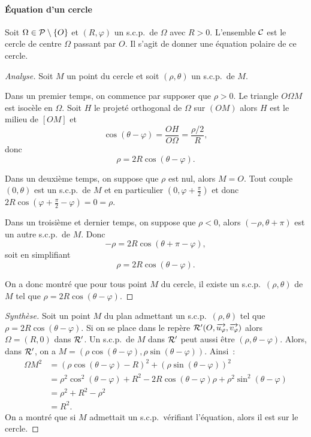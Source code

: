 \paragraph{Équation d'un cercle}
\label{par:eqcercle}
Soit \(\Omega \in \P \setminus\{O\}\) et \((R,\varphi)\) un s.c.p.\ de \(\Omega\) avec \(R>0\). L'ensemble \(\courbe\) est le cercle de centre \(\Omega\) passant par \(O\). Il s'agit de donner une équation polaire de ce cercle.
\begin{proof}[Analyse]
Soit \(M\) un point du cercle et soit \((\rho, \theta)\) un s.c.p.\ de \(M\). 

Dans un premier temps, on commence par supposer que \(\rho >0\). Le triangle \(O\Omega M\) est isocèle en \(\Omega\). Soit \(H\) le projeté orthogonal de \(\Omega\) sur \((OM)\) alors \(H\) est le milieu de \([OM]\) et
\begin{equation}
 \cos(\theta - \varphi)=\frac{OH}{O\Omega}=\frac{\rho/2}{R}, 
\end{equation}
donc
\begin{equation}  
  \rho=2R \cos(\theta-\varphi). 
\end{equation}

Dans un deuxième temps, on suppose que \(\rho\) est nul, alors \(M=O\). Tout couple \((0,\theta)\) est un s.c.p.\ de \(M\) et en particulier \((0,\varphi+\frac{\pi}{2})\) et donc \(2R \cos(\varphi+\frac{\pi}{2} - \varphi)=0=\rho\). 

Dans un troisième et dernier temps, on suppose que \(\rho <0\), alors \((-\rho, \theta+\pi)\) est un autre s.c.p.\ de \(M\). Donc
\begin{equation}
  -\rho = 2R \cos(\theta+\pi-\varphi),
\end{equation}
soit en simplifiant
\begin{equation}
  \rho=2R\cos(\theta-\varphi).
\end{equation}

On a donc montré que pour tous point \(M\) du cercle, il existe un s.c.p.\ \((\rho,\theta)\) de \(M\) tel que \(\rho=2R\cos(\theta-\varphi)\).
\end{proof}
\begin{proof}[Synthèse]
Soit un point \(M\) du plan admettant un s.c.p.\ \((\rho,\theta)\) tel que \(\rho=2R\cos(\theta-\varphi)\). Si on se place dans le repère \(\Rep' (O,\vect{u_\varphi}, \vect{v_\varphi})\) alors \(\Omega =(R,0)\) dans \(\Rep'\). Un s.c.p.\ de \(M\) dans \(\Rep'\) peut aussi être \((\rho,\theta-\varphi)\). Alors, dans \(\Rep'\), on a \(M=(\rho \cos(\theta-\varphi), \rho \sin(\theta-\varphi))\). Ainsi~:
\begin{align}
  {\Omega M}^2&=(\rho\cos(\theta-\varphi)-R)^2 + (\rho\sin(\theta-\varphi))^2 \\
  &= \rho^2 \cos^2(\theta-\varphi)+R^2 - 2R\cos(\theta-\varphi)\rho + \rho^2 \sin^2(\theta-\varphi) \\
  &= \rho^2 + R^2 - \rho^2\\
  &= R^2.
\end{align}
On a montré que si \(M\) admettait un s.c.p.\ vérifiant l'équation, alors il est sur le cercle.
\end{proof}
